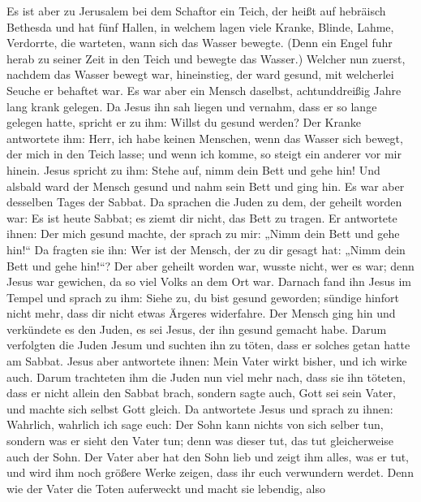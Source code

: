 Es ist aber zu Jerusalem bei dem Schaftor ein Teich, der heißt auf
hebräisch Bethesda und hat fünf Hallen,  in welchem lagen
viele Kranke, Blinde, Lahme, Verdorrte, die warteten, wann sich das
Wasser bewegte.  (Denn ein Engel fuhr herab zu seiner Zeit
in den Teich und bewegte das Wasser.) Welcher nun zuerst, nachdem das
Wasser bewegt war, hineinstieg, der ward gesund, mit welcherlei Seuche
er behaftet war.  Es war aber ein Mensch daselbst,
achtunddreißig Jahre lang krank gelegen.  Da Jesus ihn sah
liegen und vernahm, dass er so lange gelegen hatte, spricht er zu ihm:
Willst du gesund werden?  Der Kranke antwortete ihm: Herr,
ich habe keinen Menschen, wenn das Wasser sich bewegt, der mich in den
Teich lasse; und wenn ich komme, so steigt ein anderer vor mir hinein.
 Jesus spricht zu ihm: Stehe auf, nimm dein Bett und gehe
hin!  Und alsbald ward der Mensch gesund und nahm sein Bett
und ging hin. Es war aber desselben Tages der Sabbat.  Da
sprachen die Juden zu dem, der geheilt worden war: Es ist heute Sabbat;
es ziemt dir nicht, das Bett zu tragen.  Er antwortete
ihnen: Der mich gesund machte, der sprach zu mir: „Nimm dein Bett und
gehe hin!{}``  Da fragten sie ihn: Wer ist der Mensch, der
zu dir gesagt hat: „Nimm dein Bett und gehe hin!{}``?  Der
aber geheilt worden war, wusste nicht, wer es war; denn Jesus war
gewichen, da so viel Volks an dem Ort war.  Darnach fand
ihn Jesus im Tempel und sprach zu ihm: Siehe zu, du bist gesund
geworden; sündige hinfort nicht mehr, dass dir nicht etwas Ärgeres
widerfahre.  Der Mensch ging hin und verkündete es den
Juden, es sei Jesus, der ihn gesund gemacht habe.  Darum
verfolgten die Juden Jesum und suchten ihn zu töten, dass er solches
getan hatte am Sabbat.  Jesus aber antwortete ihnen: Mein
Vater wirkt bisher, und ich wirke auch.  Darum trachteten
ihm die Juden nun viel mehr nach, dass sie ihn töteten, dass er nicht
allein den Sabbat brach, sondern sagte auch, Gott sei sein Vater, und
machte sich selbst Gott gleich.  Da antwortete Jesus und
sprach zu ihnen: Wahrlich, wahrlich ich sage euch: Der Sohn kann nichts
von sich selber tun, sondern was er sieht den Vater tun; denn was dieser
tut, das tut gleicherweise auch der Sohn.  Der Vater aber
hat den Sohn lieb und zeigt ihm alles, was er tut, und wird ihm noch
größere Werke zeigen, dass ihr euch verwundern werdet. 
Denn wie der Vater die Toten auferweckt und macht sie lebendig, also

